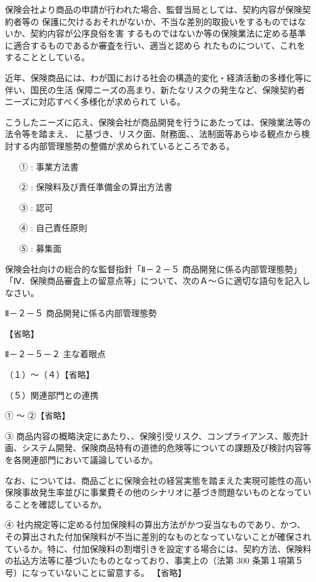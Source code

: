\documentclass[report,gutter=10mm,fore-edge=10mm,uplatex,dvipdfmx]{jlreq}
\begin{document}
保険会社より商品の申請が行われた場合、監督当局としては、契約内容が保険契約者等の
保護に欠けるおそれがないか、不当な差別的取扱いをするものではないか、契約内容が公序良俗を害
するものではないか等の保険業法に定める基準に適合するものであるか審査を行い、適当と認めら
れたものについて、これをすることとしている。

近年、保険商品には、わが国における社会の構造的変化・経済活動の多様化等に伴い、国民の生活
保障ニーズの高まり、新たなリスクの発生など、保険契約者ニーズに対応すべく多様化が求められて
いる。

こうしたニーズに応え、保険会社が商品開発を行うにあたっては、保険業法等の法令等を踏まえ、
に基づき、リスク面、財務面、、法制面等あらゆる観点から検討する内部管理態勢の整備が求められているところである。

\answer{}
\begin{itemize}
\item[ ① :] 事業方法書
\item[ ② :] 保険料及び責任準備金の算出方法書
\item[ ③ :] 認可
\item[ ④ :] 自己責任原則
\item[ ⑤ :] 募集面
\end{itemize}


保険会社向けの総合的な監督指針「Ⅱ－２－５ 商品開発に係る内部管理態勢」
「Ⅳ．保険商品審査上の留意点等」について、次のＡ〜Ｇに適切な語句を記入しなさい。

Ⅱ－２－５ 商品開発に係る内部管理態勢

【省略】

Ⅱ－２－５－２ 主な着眼点

（１）～（４）【省略】

（５）関連部門との連携

① ～ ②【省略】

③ 商品内容の概略決定にあたり、、保険引受リスク、コンプライアンス、販売計画、システム開発、保険商品特有の道徳的危険等についての課題及び検討内容等を各関連部門において議論しているか。

なお、については、商品ごとに保険会社の経営実態を踏まえた実現可能性の高い保険事故発生率並びに事業費その他のシナリオに基づき問題ないものとなっていることを確認しているか。

④ 社内規定等に定める付加保険料の算出方法がかつ妥当なものであり、かつ、その算出された付加保険料が不当に差別的なものとなっていないことが確保されているか。特に、付加保険料の割増引きを設定する場合には、契約方法、保険料の払込方法等に基づいたものとなっており、事実上の（法第 300 条第１項第５号）になっていないことに留意する。
【省略】
\end{document}
